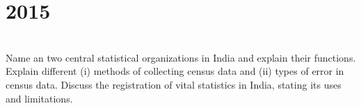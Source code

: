 \section*{2015}
\vspace{-.5cm}
\hrulefill \smallskip\\
 Name an two central statistical organizations in India and explain their functions.
\myline
{} Explain different (i) methods of collecting census data and (ii) types of error in census data.
\myline
{} Discuss the registration of vital statistics in India, stating its uses and limitations.
